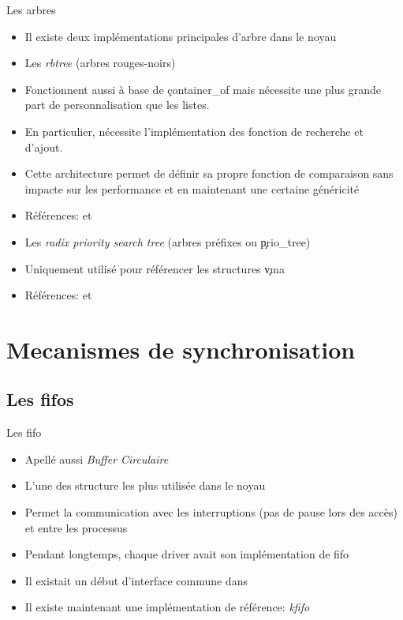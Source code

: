 \begin{frame}[fragile=singleslide]{Les arbres}
  \begin{itemize} 
  \item  Il existe  deux implémentations  principales d'arbre  dans le
    noyau
  \item Les \emph{rbtree} (arbres rouges-noirs)
  \item Fonctionnent  aussi à base de  \c{container_of} mais nécessite
    une plus grande part de personnalisation que les listes.
  \item  En particulier,  nécessite l'implémentation  des  fonction de
    recherche et d'ajout.
  \item  Cette architecture permet  de définir  sa propre  fonction de
    comparaison sans impacte sur  les performance et en maintenant une
    certaine généricité
  \item       Références:            et
  \item  Les \emph{radix  priority  search tree}  (arbres préfixes  ou
    \c{prio_tree})
  \item Uniquement utilisé pour référencer les structures \c{vma}
  \item      Références:          et
  \end{itemize} 
\end{frame} 


\section{Mecanismes de synchronisation}

\subsection{Les fifos}

\begin{frame}[fragile=singleslide]{Les fifo}
  \begin{itemize} 
  \item Apellé aussi \emph{Buffer Circulaire}
  \item L'une des structure les plus utilisée dans le noyau
  \item Permet  la communication avec les interruptions  (pas de pause
    lors des accès) et entre les processus
  \item Pendant  longtemps, chaque driver avait  son implémentation de
    fifo
  \item    Il   existait   un    début   d'interface    commune   dans
  \item  Il   existe  maintenant  une   implémentation  de  référence:
    \emph{kfifo}
  \end{itemize} 
\end{frame} 

